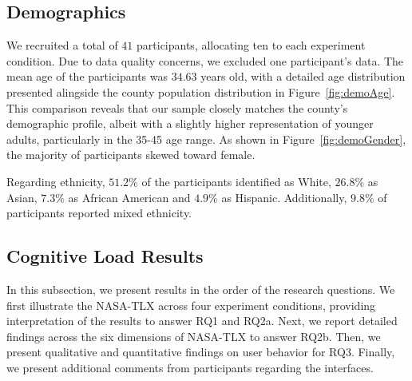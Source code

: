 
\subsection{Demographics}
We recruited a total of $41$ participants, allocating ten to each experiment condition. Due to data quality concerns, we excluded one participant's data. The mean age of the participants was $34.63$ years old, with a detailed age distribution presented alingside the county population distribution in Figure~\ref{fig:demoAge}. This comparison reveals that our sample closely matches the county's demographic profile, albeit with a slightly higher representation of younger adults, particularly in the 35-45 age range. As shown in Figure~\ref{fig:demoGender}, the majority of participants skewed toward female.

Regarding ethnicity, $51.2\%$ of the participants identified as White, $26.8\%$ as Asian, $7.3\%$ as African American and $4.9\%$ as Hispanic. Additionally, $9.8\%$ of participants reported mixed ethnicity.

\subsection{Cognitive Load Results}
In this subsection, we present results in the order of the research questions. We first illustrate the NASA-TLX across four experiment conditions, providing interpretation of the results to answer RQ1 and RQ2a. Next, we report detailed findings across the six dimensions of NASA-TLX to answer RQ2b. Then, we present qualitative and quantitative findings on user behavior for RQ3. Finally, we present additional comments from participants regarding the interfaces.

